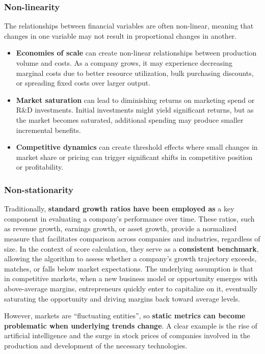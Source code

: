 \documentclass[11pt,english,a4paper,hidelinks]{book}
\begin{document}
\subsubsection{Non-linearity}
\noindent The relationships between financial variables are often non-linear, meaning that changes in one variable may not result in proportional changes in another.

\begin{itemize}
    \item \textbf{Economies of scale} can create non-linear relationships between production volume and costs. As a company grows, it may experience decreasing marginal costs due to better resource utilization, bulk purchasing discounts, or spreading fixed costs over larger output.
    
    \item \textbf{Market saturation} can lead to diminishing returns on marketing spend or R\&D investments. Initial investments might yield significant returns, but as the market becomes saturated, additional spending may produce smaller incremental benefits.
    
    \item \textbf{Competitive dynamics} can create threshold effects where small changes in market share or pricing can trigger significant shifts in competitive position or profitability.
\end{itemize}

\subsubsection{Non-stationarity}

\noindent Traditionally, \textbf{standard growth ratios have been employed as} a key component in evaluating a company’s performance over time. These ratios, such as revenue growth, earnings growth, or asset growth, provide a normalized measure that facilitates comparison across companies and industries, regardless of size. In the context of score calculation, they serve as a \textbf{consistent benchmark}, allowing the algorithm to assess whether a company’s growth trajectory exceeds, matches, or falls below market expectations. The underlying assumption is that in competitive markets, when a new business model or opportunity emerges with above-average margins, entrepreneurs quickly enter to capitalize on it, eventually saturating the opportunity and driving margins back toward average levels. 

\vspace{0.5cm}
\noindent However, markets are ``fluctuating entities'', so \textbf{static metrics can become problematic when underlying trends change}. A clear example is the rise of artificial intelligence and the surge in stock prices of companies involved in the production and development of the necessary technologies.
\end{document}
